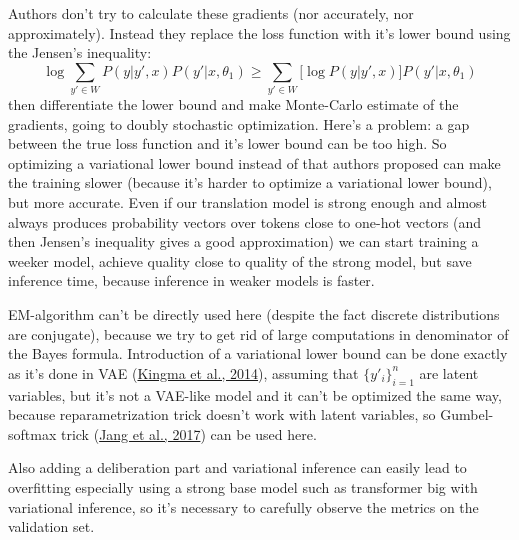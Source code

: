 \documentclass{article}
\begin{document}
    Authors don't try to calculate these gradients (nor accurately, nor approximately). Instead they replace the loss function with it's lower bound using the Jensen's inequality:
    $$\log \sum_{y' \in W} P(y | y', x) P(y' | x, \theta_1) \geq \sum_{y' \in W} \Big [ \log P(y | y', x) \Big] P(y' | x, \theta_1)$$
    then differentiate the lower bound and make Monte-Carlo estimate of the gradients, going to doubly stochastic optimization. Here's a problem: a gap between the true loss function and it's lower bound can be too high. So optimizing a variational lower bound instead of that authors proposed can make the training slower (because it's harder to optimize a variational lower bound), but more accurate. Even if our translation model is strong enough and almost always produces probability vectors over tokens close to one-hot vectors (and then Jensen's inequality gives a good approximation) we can start training a weeker model, achieve quality close to quality of the strong model, but save inference time, because inference in weaker models is faster.

    EM-algorithm can't be directly used here (despite the fact discrete distributions are conjugate), because we try to get rid of large computations in denominator of the Bayes formula. Introduction of a variational lower bound can be done exactly as it's done in VAE (\hyperref[itm:vae]{Kingma et al., 2014}), assuming that $\{y'_i\}_{i = 1}^n$ are latent variables, but it's not a VAE-like model and it can't be optimized the same way, because reparametrization trick doesn't work with latent variables, so Gumbel-softmax trick (\hyperref[itm:gumbel]{Jang et al., 2017}) can be used here.

    	Also adding a deliberation part and variational inference can easily lead to overfitting especially using a strong base model such as transformer big with variational inference, so it's necessary to carefully observe the metrics on the validation set.
\end{document}
